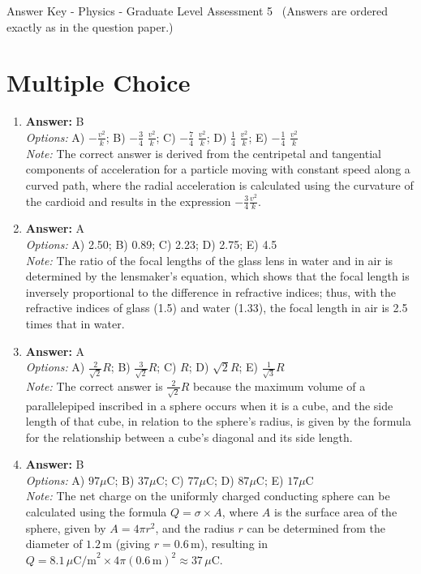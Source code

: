 \documentclass[12pt]{article}
\begin{document}
\begin{center}
Answer Key - Physics - Graduate Level Assessment 5 \
\small (Answers are ordered exactly as in the question paper.)
\end{center}

\section*{Multiple Choice}
\begin{enumerate}[label=\arabic*.]
\item \textbf{Answer:} B
\\ \textit{Options:} A) $-\frac{v^2}{k}$; B) $-\frac{3}{4}$ $\frac{v^2}{k}$; C) $-\frac{7}{4}$ $\frac{v^2}{k}$; D) $\frac{1}{4}$ $\frac{v^2}{k}$; E) $-\frac{1}{4}$ $\frac{v^2}{k}$
\\ \textit{Note:} The correct answer is derived from the centripetal and tangential components of acceleration for a particle moving with constant speed along a curved path, where the radial acceleration is calculated using the curvature of the cardioid and results in the expression $-\frac{3}{4} \frac{v^2}{k}$.
\item \textbf{Answer:} A
\\ \textit{Options:} A) 2.50; B) 0.89; C) 2.23; D) 2.75; E) 4.5
\\ \textit{Note:} The ratio of the focal lengths of the glass lens in water and in air is determined by the lensmaker's equation, which shows that the focal length is inversely proportional to the difference in refractive indices; thus, with the refractive indices of glass (1.5) and water (1.33), the focal length in air is 2.5 times that in water.
\item \textbf{Answer:} A
\\ \textit{Options:} A) $\frac{2}{\sqrt{2}}R$; B) $\frac{3}{\sqrt{2}}R$; C) $R$; D) $\sqrt{2}R$; E) $\frac{1}{\sqrt{3}}R$
\\ \textit{Note:} The correct answer is $\frac{2}{\sqrt{2}}R$ because the maximum volume of a parallelepiped inscribed in a sphere occurs when it is a cube, and the side length of that cube, in relation to the sphere's radius, is given by the formula for the relationship between a cube's diagonal and its side length.
\item \textbf{Answer:} B
\\ \textit{Options:} A) $97 \mu \mathrm{C}$; B) $37$$\mu \mathrm{C}$; C) $77 \mu \mathrm{C}$; D) $87 \mu \mathrm{C}$; E) $17 \mu \mathrm{C}$
\\ \textit{Note:} The net charge on the uniformly charged conducting sphere can be calculated using the formula \( Q = \sigma \times A \), where \( A \) is the surface area of the sphere, given by \( A = 4\pi r^2 \), and the radius \( r \) can be determined from the diameter of \( 1.2 \, \mathrm{m} \) (giving \( r = 0.6 \, \mathrm{m} \)), resulting in \( Q = 8.1 \, \mu \mathrm{C/m}^2 \times 4\pi (0.6 \, \mathrm{m})^2 \approx 37 \, \mu \mathrm{C} \).
$$
\end{enumerate}
\end{document}
